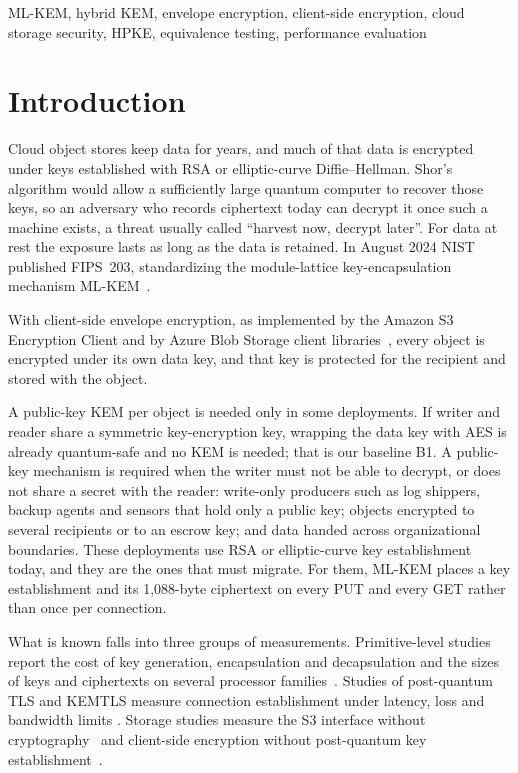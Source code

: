 \documentclass[conference]{IEEEtran}
\begin{document}
\begin{IEEEkeywords}
ML-KEM, hybrid KEM, envelope encryption, client-side encryption, cloud storage security,
HPKE, equivalence testing, performance evaluation
\end{IEEEkeywords}

\section{Introduction}
Cloud object stores keep data for years, and much of that data is encrypted under keys
established with RSA or elliptic-curve Diffie--Hellman. Shor's algorithm would allow a
sufficiently large quantum computer to recover those keys, so an adversary who records
ciphertext today can decrypt it once such a machine exists, a threat usually called
``harvest now, decrypt later''. For data at rest the exposure lasts as long as the data is
retained. In August 2024 NIST published FIPS~203, standardizing the module-lattice
key-encapsulation mechanism ML-KEM~\cite{fips203}.

With client-side envelope encryption, as implemented by the Amazon S3 Encryption Client and by
Azure Blob Storage client libraries~\cite{s3ec,azurecse}, every object is encrypted under its own
data key, and that key is protected for the recipient and stored with the object.

A public-key KEM per object is needed only in some deployments. If writer and reader share a symmetric
key-encryption key, wrapping the data key with AES is already quantum-safe and no KEM is needed;
that is our baseline B1. A public-key mechanism is required when the writer must not be able to
decrypt, or does not share a secret with the reader: write-only producers such as log shippers,
backup agents and sensors that hold only a public key; objects encrypted to several recipients
or to an escrow key; and data handed across organizational boundaries. These deployments use RSA
or elliptic-curve key establishment today, and they are the ones that must migrate. For them,
ML-KEM places a key establishment and its 1{,}088-byte ciphertext on every PUT and every GET
rather than once per connection.

What is known falls into three groups of measurements. Primitive-level studies report the cost of key generation, encapsulation
and decapsulation and the sizes of keys and ciphertexts on several processor
families~\cite{liboqs,rodriguez2025,demir2025,lopez2025}. Studies of post-quantum TLS and KEMTLS
measure connection establishment under latency, loss and bandwidth limits
\cite{paquin2020,sikeridis2020,sosnowski2023,giron2023}. Storage studies measure the S3 interface
without cryptography~\cite{gadban2021} and client-side encryption without post-quantum key
establishment~\cite{henziger2019,ozeri2023}.
\end{document}
